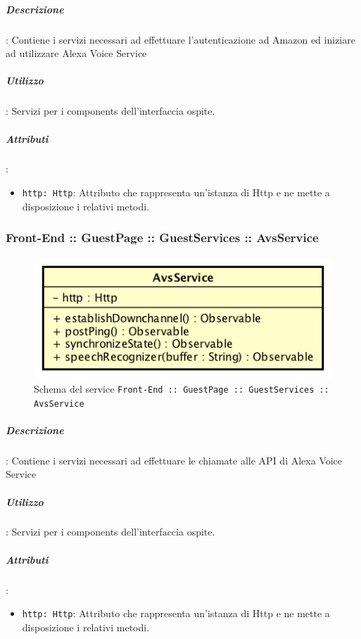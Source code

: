 \documentclass[../ManualeSviluppatore_v1.0.0.tex]{subfiles}
\begin{document}
			\subparagraph{Descrizione}: Contiene i servizi necessari ad effettuare l'autenticazione ad Amazon ed iniziare ad utilizzare Alexa Voice Service
			\subparagraph{Utilizzo}: Servizi per i components dell'interfaccia ospite.
			\subparagraph{Attributi}:
			\begin{itemize}
				\item \texttt{http: Http}: Attributo che rappresenta un'istanza di Http e ne mette a disposizione i relativi metodi.
			\end{itemize}

\newpage
			\subsubsection{Front-End :: GuestPage :: GuestServices :: AvsService}
			\begin{figure}[!h]
				\centering
				\includegraphics[scale=0.6]{Architettura/Front-End/GuestPage/GuestServices/AvsService.png}
				\caption{Schema del service \texttt{Front-End :: GuestPage :: GuestServices :: AvsService}}
			\end{figure}

				\subparagraph{Descrizione}: Contiene i servizi necessari ad effettuare le chiamate alle API di Alexa Voice Service
				\subparagraph{Utilizzo}: Servizi per i components dell'interfaccia ospite.
				\subparagraph{Attributi}:
				\begin{itemize}
					\item \texttt{http: Http}: Attributo che rappresenta un'istanza di Http e ne mette a disposizione i relativi metodi.
				\end{itemize}
\end{document}
